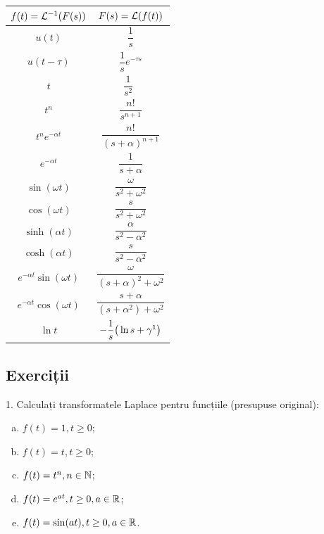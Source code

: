 \begin{center}
\begin{tabular}{c | c}
  $ f(t) = \mathcal{L}^{-1} (F(s)) $ & $ F(s) = \mathcal{L}(f(t)) $ \\
  \hline\hline
  $ u(t) $ & $ \dfrac{1}{s} $ \\
  $ u(t - \tau) $ & $ \dfrac{1}{s} e^{-\tau s} $ \\
  $ t $ & $ \dfrac{1}{s^2} $ \\
  $ t^n $ & $ \dfrac{n!}{s^{n+1}} $ \\
  $ t^n e^{-\alpha t} $ & $ \dfrac{n!}{(s + \alpha)^{n+1}} $ \\
  $ e^{-\alpha t} $ & $ \dfrac{1}{s + \alpha} $ \\
  $ \sin (\omega t) $ & $ \dfrac{\omega}{s^2 + \omega^2} $ \\
  $ \cos (\omega t) $ & $ \dfrac{s}{s^2 + \omega^2} $ \\
  $ \sinh(\alpha t) $ & $ \dfrac{\alpha}{s^2 - \alpha^2} $ \\
  $ \cosh(\alpha t) $ & $ \dfrac{s}{s^2 - \alpha^2} $ \\
  $ e^{-\alpha t}\sin(\omega t) $ & $ \dfrac{\omega}{(s + \alpha)^2 + \omega^2} $ \\
  $ e^{-\alpha t}\cos(\omega t) $ & $ \dfrac{s + \alpha}{(s + \alpha^2) + \omega^2} $ \\
  $ \ln t $ & $ -\dfrac{1}{s} \big( \ln s + \gamma\footnotemark \big) $
\end{tabular}
\end{center}



\newpage
\subsection{Exerciții}

1. Calculați transformatele Laplace pentru funcțiile (presupuse original):
\begin{enumerate}[(a)]
\item $ f(t) = 1, t \geq 0 $;
\item $ f(t) = t, t \geq 0 $;
\item $ f(t) = t^n, n \in \mathbb{N} $;
\item $ f(t) = e^{at}, t \geq 0, a \in \mathbb{R} $;
\item $ f(t) = \sin(at), t \geq 0, a \in \mathbb{R} $.
\end{enumerate}


